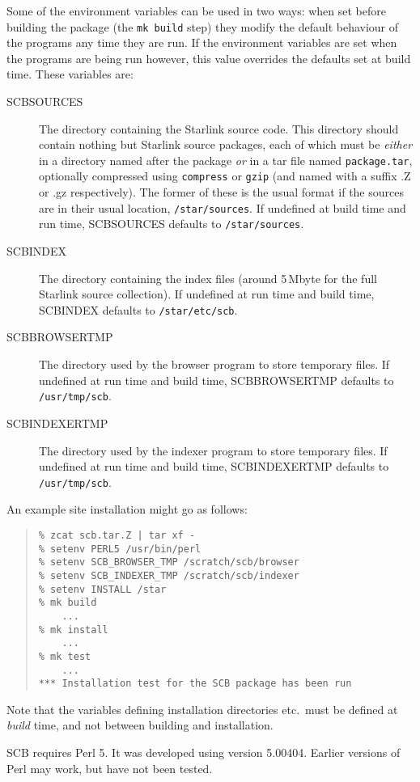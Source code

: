 \documentclass[twoside,11pt]{article}
\renewcommand{\_}{\texttt{\symbol{95}}}
\begin{document}
Some of the environment variables can be used in two ways:
when set before building the package (the {\tt mk build} step)
they modify the default behaviour of the programs any time they are run.  
If the environment variables are set when the programs are being
run however, this value overrides the defaults set at build time.
These variables are:
\begin{description}
\item[SCB\_SOURCES]
The directory containing the Starlink source code.  
This directory should contain nothing but Starlink source packages,
each of which must be {\em either\/} in a directory named after the package
{\em or\/} in a tar file named {\tt package.tar}, optionally compressed
using {\tt compress} or {\tt gzip} (and named with a suffix .Z or .gz 
respectively).
The former of these is the usual format if the sources are in
their usual location, {\tt /star/sources}.
If undefined at build time and run time, SCB\_SOURCES 
defaults to {\tt /star/sources}.
\item[SCB\_INDEX]
The directory containing the index files (around 5\,Mbyte for the full
Starlink source collection).
If undefined at run time and build time, SCB\_INDEX defaults to
{\tt /star/etc/scb}.
\item[SCB\_BROWSER\_TMP]
The directory used by the browser program to store temporary files. 
If undefined at run time and build time, SCB\_BROWSER\_TMP defaults to
{\tt /usr/tmp/scb}.
\item[SCB\_INDEXER\_TMP]
The directory used by the indexer program to store temporary files. 
If undefined at run time and build time, SCB\_INDEXER\_TMP defaults to
{\tt /usr/tmp/scb}.
\end{description}

An example site installation might go as follows:
\begin{quote}
\begin{verbatim}
% zcat scb.tar.Z | tar xf -
% setenv PERL5 /usr/bin/perl
% setenv SCB_BROWSER_TMP /scratch/scb/browser
% setenv SCB_INDEXER_TMP /scratch/scb/indexer
% setenv INSTALL /star
% mk build
    ...
% mk install
    ...
% mk test
    ...
*** Installation test for the SCB package has been run
\end{verbatim}
\end{quote}

Note that the variables defining installation directories 
etc.\ must be defined at {\em build} time, 
and not between building and installation.

SCB requires Perl 5.  It was developed using version 5.004\_04.
Earlier versions of Perl may work, but have not been tested.
\end{document}
